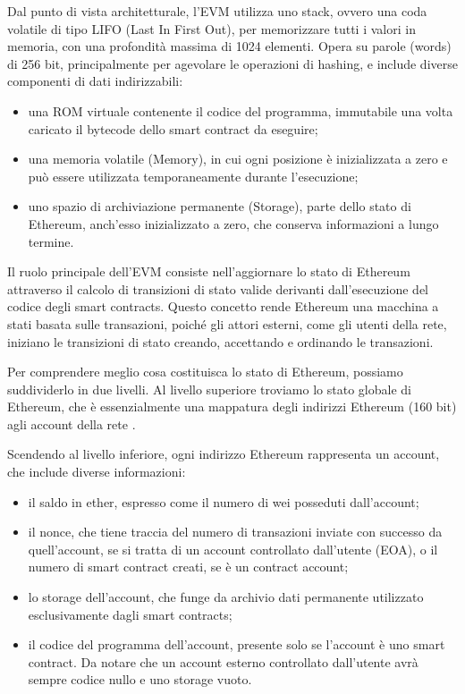 Dal punto di vista architetturale, l’EVM utilizza uno stack, ovvero una coda volatile di tipo LIFO (Last In First Out), per memorizzare tutti i valori 
in memoria, con una profondità massima di 1024 elementi. Opera su parole (words) di 256 bit, principalmente per agevolare le operazioni di hashing, 
e include diverse componenti di dati indirizzabili:

\begin{itemize}
    \item una ROM virtuale contenente il codice del programma, immutabile una volta caricato il bytecode dello smart contract da eseguire;
    \item una memoria volatile (Memory), in cui ogni posizione è inizializzata a zero e può essere utilizzata temporaneamente durante l’esecuzione;
    \item uno spazio di archiviazione permanente (Storage), parte dello stato di Ethereum, anch’esso inizializzato a zero, che conserva informazioni a lungo termine.
\end{itemize}

Il ruolo principale dell’EVM consiste nell’aggiornare lo stato di Ethereum attraverso il calcolo di transizioni di stato valide derivanti dall’esecuzione 
del codice degli smart contracts. Questo concetto rende Ethereum una macchina a stati basata sulle transazioni, poiché gli attori esterni, come gli 
utenti della rete, iniziano le transizioni di stato creando, accettando e ordinando le transazioni.

Per comprendere meglio cosa costituisca lo stato di Ethereum, possiamo suddividerlo in due livelli. Al livello superiore troviamo lo stato globale di 
Ethereum, che è essenzialmente una mappatura degli indirizzi Ethereum (160 bit) agli account della rete \cite{antonopoulos2018mastering}.

Scendendo al livello inferiore, ogni indirizzo Ethereum rappresenta un account, che include diverse informazioni:

\begin{itemize}
    \item il saldo in ether, espresso come il numero di wei posseduti dall’account;
    \item il nonce, che tiene traccia del numero di transazioni inviate con successo da quell’account, se si tratta di un account controllato dall’utente (EOA), 
        o il numero di smart contract creati, se è un contract account;
    \item lo storage dell’account, che funge da archivio dati permanente utilizzato esclusivamente dagli smart contracts;
    \item il codice del programma dell’account, presente solo se l’account è uno smart contract. Da notare che un account esterno controllato dall’utente avrà 
        sempre codice nullo e uno storage vuoto.
\end{itemize}

